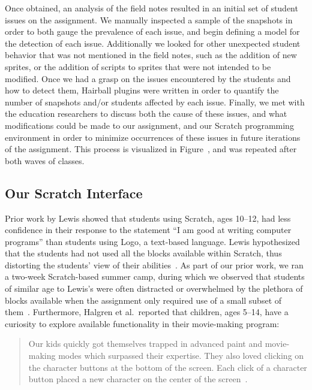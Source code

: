 Once obtained, an analysis of the field notes resulted in an initial set of
student issues on the assignment. We manually inspected a sample of the
snapshots in order to both gauge the prevalence of each issue, and begin
defining a model for the detection of each issue. Additionally we looked for
other unexpected student behavior that was not mentioned in the field notes,
such as the addition of new sprites, or the addition of scripts to sprites that
were not intended to be modified. Once we had a grasp on the issues encountered
by the students and how to detect them, Hairball plugins were written in order
to quantify the number of snapshots and/or students affected by each
issue. Finally, we met with the education researchers to discuss both the cause
of these issues, and what modifications could be made to our assignment, and
our Scratch programming environment in order to minimize occurrences of these
issues in future iterations of the assignment. This process is visualized in
Figure~, and was repeated after both waves of classes.

\subsection{Our Scratch Interface} 
Prior work by Lewis showed that students using Scratch, ages 10--12, had less
confidence in their response to the statement ``I am good at writing computer
programs'' than students using Logo, a text-based language. Lewis hypothesized
that the students had not used all the blocks available within Scratch, thus
distorting the students' view of their
abilities~\cite{Lewis:2010:PES:1734263.1734383}. As part of our prior work, we
ran a two-week Scratch-based summer camp, during which we observed that
students of similar age to Lewis's were often distracted or overwhelmed by the
plethora of blocks available when the assignment only required use of a small
subset of them~\cite{Franklin:2013:SBO}. Furthermore, Halgren et al.\ reported
that children, ages 5--14, have a curiosity to explore available functionality
in their movie-making program:

\begin{quote}
Our kids quickly got themselves trapped in advanced paint and movie-making
modes which surpassed their expertise. They also loved clicking on the
character buttons at the bottom of the screen. Each click of a character button
placed a new character on the center of the
screen~\cite{Halgren:1995:AAM:223904.223974}.
\end{quote}

